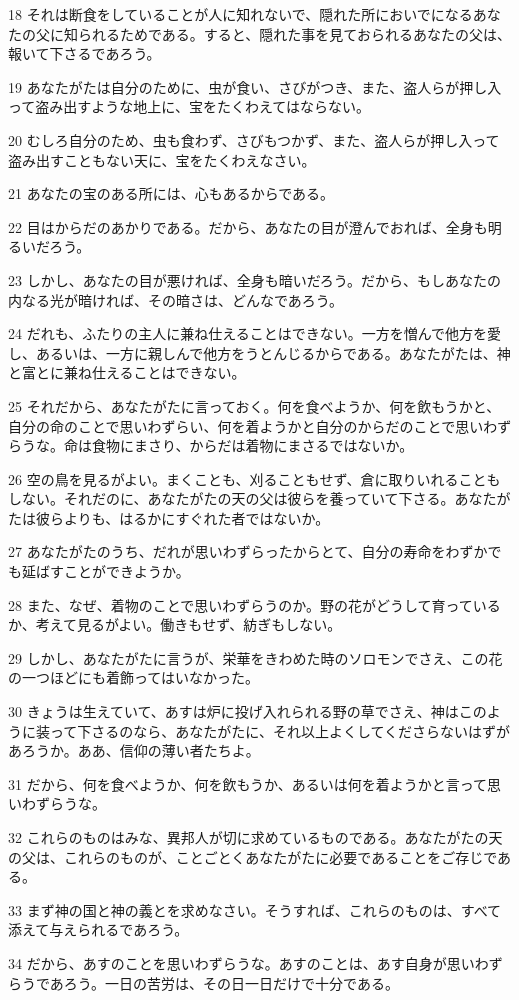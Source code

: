 \par 18 それは断食をしていることが人に知れないで、隠れた所においでになるあなたの父に知られるためである。すると、隠れた事を見ておられるあなたの父は、報いて下さるであろう。
\par 19 あなたがたは自分のために、虫が食い、さびがつき、また、盗人らが押し入って盗み出すような地上に、宝をたくわえてはならない。
\par 20 むしろ自分のため、虫も食わず、さびもつかず、また、盗人らが押し入って盗み出すこともない天に、宝をたくわえなさい。
\par 21 あなたの宝のある所には、心もあるからである。
\par 22 目はからだのあかりである。だから、あなたの目が澄んでおれば、全身も明るいだろう。
\par 23 しかし、あなたの目が悪ければ、全身も暗いだろう。だから、もしあなたの内なる光が暗ければ、その暗さは、どんなであろう。
\par 24 だれも、ふたりの主人に兼ね仕えることはできない。一方を憎んで他方を愛し、あるいは、一方に親しんで他方をうとんじるからである。あなたがたは、神と富とに兼ね仕えることはできない。
\par 25 それだから、あなたがたに言っておく。何を食べようか、何を飲もうかと、自分の命のことで思いわずらい、何を着ようかと自分のからだのことで思いわずらうな。命は食物にまさり、からだは着物にまさるではないか。
\par 26 空の鳥を見るがよい。まくことも、刈ることもせず、倉に取りいれることもしない。それだのに、あなたがたの天の父は彼らを養っていて下さる。あなたがたは彼らよりも、はるかにすぐれた者ではないか。
\par 27 あなたがたのうち、だれが思いわずらったからとて、自分の寿命をわずかでも延ばすことができようか。
\par 28 また、なぜ、着物のことで思いわずらうのか。野の花がどうして育っているか、考えて見るがよい。働きもせず、紡ぎもしない。
\par 29 しかし、あなたがたに言うが、栄華をきわめた時のソロモンでさえ、この花の一つほどにも着飾ってはいなかった。
\par 30 きょうは生えていて、あすは炉に投げ入れられる野の草でさえ、神はこのように装って下さるのなら、あなたがたに、それ以上よくしてくださらないはずがあろうか。ああ、信仰の薄い者たちよ。
\par 31 だから、何を食べようか、何を飲もうか、あるいは何を着ようかと言って思いわずらうな。
\par 32 これらのものはみな、異邦人が切に求めているものである。あなたがたの天の父は、これらのものが、ことごとくあなたがたに必要であることをご存じである。
\par 33 まず神の国と神の義とを求めなさい。そうすれば、これらのものは、すべて添えて与えられるであろう。
\par 34 だから、あすのことを思いわずらうな。あすのことは、あす自身が思いわずらうであろう。一日の苦労は、その日一日だけで十分である。

